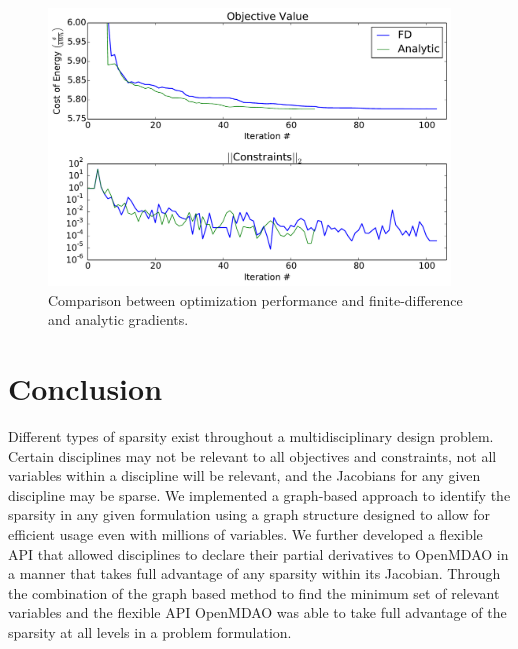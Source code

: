 \documentclass[]{aiaa-tc} %
\begin{document}
        \begin{figure}[!htbp]
          \centering
          \includegraphics[width=0.95\textwidth]{images/wt_opt_progress}
          \caption{Comparison between optimization performance and finite-difference and analytic gradients.}
          \label{fig:wt-opt-progress}
        \end{figure}




  \section{Conclusion}

      Different types of sparsity exist throughout a multidisciplinary design problem. Certain
      disciplines may not be relevant to all objectives and constraints, not all variables within a discipline will
      be relevant, and the Jacobians for any given discipline may be sparse. We implemented a graph-based
      approach to identify the sparsity in any given formulation using a graph structure designed to allow for
      efficient usage even with millions of variables. We further developed a flexible API
      that allowed disciplines to declare their partial derivatives to OpenMDAO in a manner that
      takes full advantage of any sparsity within its Jacobian. Through the combination of the graph based
      method to find the minimum set of relevant variables and the flexible API OpenMDAO was able to take full
      advantage of the sparsity at all levels in a problem formulation.
\end{document}
